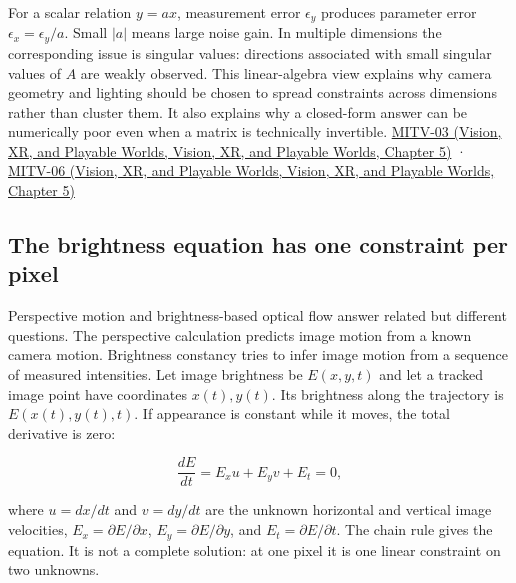 For a scalar relation \(y=ax\), measurement error \(\epsilon_y\) produces parameter error \(\epsilon_x=\epsilon_y/a\). Small \(|a|\) means large noise gain. In multiple dimensions the corresponding issue is singular values: directions associated with small singular values of \(A\) are weakly observed. This linear-algebra view explains why camera geometry and lighting should be chosen to spread constraints across dimensions rather than cluster them. It also explains why a closed-form answer can be numerically poor even when a matrix is technically invertible. \href{../07-Vision-XR-and-Playable-Worlds/main.pdf\#nameddest=04-visual-computing-ii-ch036-mitv-03---time-to-contact-focus-of-expansion-direct-motion-vision-methods-noise-gain}{MITV-03 (Vision, XR, and Playable Worlds, Vision, XR, and Playable Worlds, Chapter 5)} · \href{../07-Vision-XR-and-Playable-Worlds/main.pdf\#nameddest=04-visual-computing-ii-ch036-mitv-06---photometric-stereo-noise-gain-error-amplification-eigenvalues-and-eigenvectors-review}{MITV-06 (Vision, XR, and Playable Worlds, Vision, XR, and Playable Worlds, Chapter 5)}

\subsection{The brightness equation has one constraint per pixel}\label{04-visual-computing-ii-ch030-the-brightness-equation-has-one-constraint-per-pixel}

Perspective motion and brightness-based optical flow answer related but different questions. The perspective calculation predicts image motion from a known camera motion. Brightness constancy tries to infer image motion from a sequence of measured intensities. Let image brightness be \(E(x,y,t)\) and let a tracked image point have coordinates \(x(t),y(t)\). Its brightness along the trajectory is \(E(x(t),y(t),t)\). If appearance is constant while it moves, the total derivative is zero:

\[
\frac{dE}{dt}=E_x u+E_y v+E_t=0,
\]

where \(u=dx/dt\) and \(v=dy/dt\) are the unknown horizontal and vertical image velocities, \(E_x=\partial E/\partial x\), \(E_y=\partial E/\partial y\), and \(E_t=\partial E/\partial t\). The chain rule gives the equation. It is not a complete solution: at one pixel it is one linear constraint on two unknowns.

